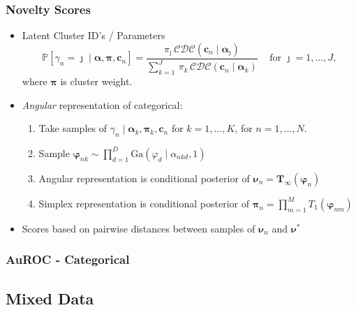 \documentclass[aspectratio=169,10pt]{beamer}
\begin{document}
\begin{frame}
    \frametitle{Novelty Scores}
    \label{ndpg:noveltyscores}
    \begin{itemize}
    \item Latent Cluster ID's / Parameters
        \[
        \mathbb{P}[\gamma_n = \jmath\mid \bm{\alpha}, \bm{\pi}, \bm{c}_n] = 
        \frac{
            \pi_{\jmath}\,\mathcal{CDC}\left(\bm{c}_n\mid\bm{\alpha}_{\jmath}\right)
            }{
            \sum_{k = 1}^J\,\pi_k\,\mathcal{CDC}\left(\bm{c}_n\mid\bm{\alpha}_k\right)
            }
            \;\;\;\text{ for }\jmath = 1, \ldots, J,
        \]
    where $\bm{\pi}$ is cluster weight.
    \item \emph{Angular} representation of categorical:
        \begin{enumerate}
            \item Take samples of $\gamma_n\mid \bm{\alpha}_k,\bm{\pi}_k,\bm{c}_n$ for $k = 1,\ldots,K$, for $n = 1,\ldots, N$.
            \item Sample $\bm{\varphi}_{nk}\sim \prod_{d = 1}^D\text{Ga}(\varphi_d\mid\alpha_{nkd},1)$
            \item Angular representation is conditional posterior of $\bm{\nu}_n = \bm{T}_{\infty}(\bm{\varphi}_n)$
            \item Simplex representation is conditional posterior of $\bm{\pi}_n = \prod_{m = 1}^MT_1(\bm{\varphi}_{nm})$
        \end{enumerate}
    \item Scores based on pairwise distances between samples of $\bm{\nu}_n$ and $\bm{\nu}^*$
    \end{itemize}
    \hyperlink{ndpg:noveltyscoresdetail}{}
\end{frame} %

\begin{frame}
    \frametitle{AuROC - Categorical}
    \begin{table}
        \centering
        
    \end{table}
\end{frame} %

\subsection{Mixed Data}
\end{document}
